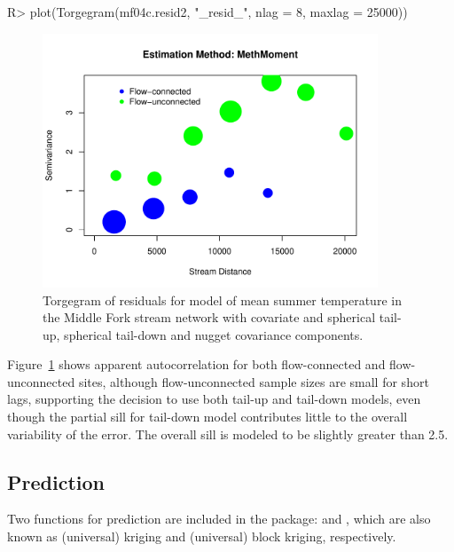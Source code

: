 \documentclass[nojss]{jss}
\renewenvironment{Schunk}{\vspace{\topsep}}{\vspace{\topsep}}
\begin{document}
\begin{Schunk}
\begin{Sinput}
R> plot(Torgegram(mf04c.resid2, "_resid_", nlag = 8, maxlag = 25000))
\end{Sinput}
\end{Schunk}

\begin{figure}[htbp]
  \begin{center}
    \includegraphics[keepaspectratio=true, width = 100mm]{Figures/jss984Fig-TorgRes}
    \caption{Torgegram of residuals for model  of mean summer
      temperature in the Middle Fork stream network with  covariate and spherical tail-up, spherical tail-down and nugget covariance components.\label{TorgRes}}
  \end{center}
\end{figure}

Figure~\ref{TorgRes} shows apparent autocorrelation for both
flow-connected and flow-unconnected sites, although flow-unconnected sample sizes are small for short lags, supporting the decision to use both tail-up and tail-down models, even though the partial sill for tail-down model contributes little to the overall variability of the error.  The overall sill is modeled to be slightly greater than 2.5. 


\subsection{Prediction}

Two functions for prediction are included in the  package:
 and , which are also known as
(universal) kriging and (universal) block kriging, respectively.
\end{document}

